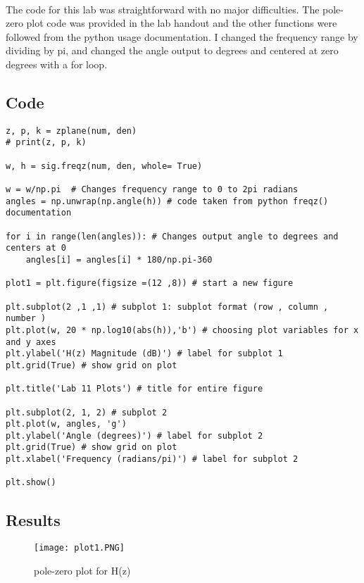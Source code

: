 \paragraph{}
The code for this lab was straightforward with no major difficulties.  The pole-zero plot code was provided in the lab handout and the other functions were followed from the python usage documentation.  I changed the frequency range by dividing by pi, and changed the angle output to degrees and centered at zero degrees with a for loop.


\subsection{Code}

\begin{scriptsize}
\begin{lstlisting}
z, p, k = zplane(num, den)
# print(z, p, k)

w, h = sig.freqz(num, den, whole= True)

w = w/np.pi  # Changes frequency range to 0 to 2pi radians
angles = np.unwrap(np.angle(h)) # code taken from python freqz() documentation

for i in range(len(angles)): # Changes output angle to degrees and centers at 0
    angles[i] = angles[i] * 180/np.pi-360

plot1 = plt.figure(figsize =(12 ,8)) # start a new figure

plt.subplot(2 ,1 ,1) # subplot 1: subplot format (row , column , number )
plt.plot(w, 20 * np.log10(abs(h)),'b') # choosing plot variables for x and y axes
plt.ylabel('H(z) Magnitude (dB)') # label for subplot 1
plt.grid(True) # show grid on plot

plt.title('Lab 11 Plots') # title for entire figure 

plt.subplot(2, 1, 2) # subplot 2
plt.plot(w, angles, 'g')
plt.ylabel('Angle (degrees)') # label for subplot 2
plt.grid(True) # show grid on plot
plt.xlabel('Frequency (radians/pi)') # label for subplot 2

plt.show()
\end{lstlisting}
\end{scriptsize}

\subsection{Results}

\begin{figure}[H]
   	\centering
   	\texttt{[image: plot1.PNG]}
   	\caption{pole-zero plot for H(z)}
\end{figure}
 
